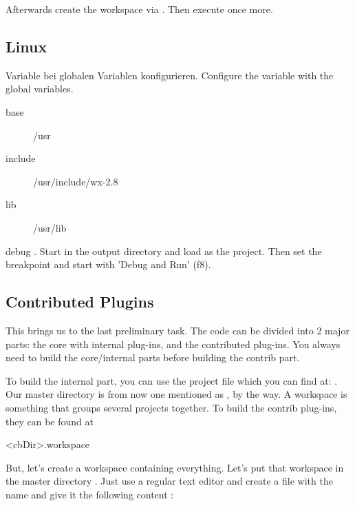 Afterwards create the workspace  via . Then execute  once more.

\subsection{Linux}

Variable  bei globalen Variablen konfigurieren.
Configure the  variable with the global variables.

\begin{description}
\item[base] /usr
\item[include] /usr/include/wx-2.8
\item[lib] /usr/lib
\end{description}

debug \codeblocks.
Start \codeblocks in the output directory and load  as the project. Then set the breakpoint and start with 'Debug and Run' (f8).

\subsection{Contributed Plugins}

This brings us to the last preliminary task. The \codeblocks code can be divided into 2 major parts: the core with internal plug-ins, and the contributed plug-ins. You always need to build the core/internal parts before building the contrib part.

To build the internal part, you can use the \codeblocks project file which you can find at: . Our \codeblocks master directory is from now one mentioned as , by the way. A workspace is something that groups several projects together. To build the contrib plug-ins, they can be found at

\begin{cmd}
<cbDir>\src\ContribPlugins.workspace
\end{cmd}


But, let's create a workspace containing everything. Let's put that workspace in the master directory . Just use a regular text editor and create a file with the name  and give it the following content :


